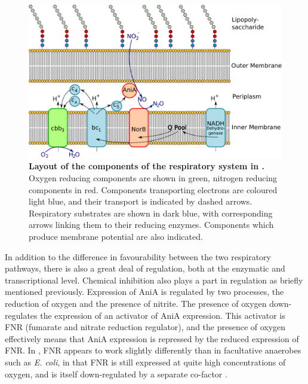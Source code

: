 \begin{figure}[tbp]
 \begin{center}
 \includegraphics[width=14cm]{./01-introduction/data/Respiratory_layout.pdf}
\end{center}
\caption[{\bf Layout of the components of the respiratory system in \Nsm{}.}]{{\bf Layout of the components of the respiratory system in \Nsm{}.} Oxygen reducing components are shown in green, nitrogen reducing components in red. Components transporting electrons are coloured light blue, and their transport is indicated by dashed arrows. Respiratory substrates are shown in dark blue, with corresponding arrows linking them to their reducing enzymes. Components which produce membrane potential are also indicated.
\label{fig:etc}}
\end{figure}

In addition to the difference in favourability between the two respiratory pathways, there is also a great deal of regulation, both at the enzymatic and transcriptional level. Chemical inhibition also plays a part in regulation as briefly mentioned previously. Expression of AniA is regulated by two processes, the reduction of oxygen and the presence of nitrite. The presence of oxygen down-regulates the expression of an activator of AniA expression. This activator is FNR (fumarate and nitrate reduction regulator), and the presence of oxygen effectively means that AniA expression is repressed by the reduced expression of FNR. In \Nm{}, FNR appears to work slightly differently than in facultative anaerobes such as \textit{E. coli}, in that FNR is still expressed at quite high concentrations of oxygen, and is itself down-regulated by a separate co-factor \cite{Rock2007}.

